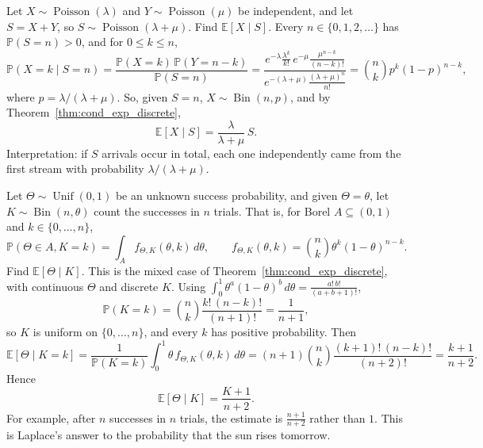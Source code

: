 	\begin{example}
		\label{ex:cond-exp-poisson}
		Let $X \sim \operatorname{Poisson}(\lambda)$ and $Y \sim \operatorname{Poisson}(\mu)$ be independent, and let $S = X + Y$, so $S \sim \operatorname{Poisson}(\lambda + \mu)$. Find $\mathbb{E}[X \mid S]$. Every $n \in \{0, 1, 2, \dots\}$ has $\mathbb{P}(S = n) > 0$, and for $0 \le k \le n$,
		\begin{equation}
			\mathbb{P}(X = k \mid S = n) = \frac{\mathbb{P}(X = k)\,\mathbb{P}(Y = n - k)}{\mathbb{P}(S = n)} = \frac{e^{-\lambda} \frac{\lambda^k}{k!}\, e^{-\mu} \frac{\mu^{n-k}}{(n-k)!}} {e^{-(\lambda + \mu)} \frac{(\lambda + \mu)^n}{n!}} = \binom{n}{k} p^k (1 - p)^{n - k},
		\end{equation}
		where $p = \lambda / (\lambda + \mu)$. So, given $S = n$, $X \sim \operatorname{Bin}(n, p)$, and by Theorem~\ref{thm:cond_exp_discrete},
		\begin{equation}
			\mathbb{E}[X \mid S] = \frac{\lambda}{\lambda + \mu}\, S.
		\end{equation}
		Interpretation: if $S$ arrivals occur in total, each one independently came from the first stream with probability $\lambda / (\lambda + \mu)$.
	\end{example}

	\begin{example}
		\label{ex:cond-exp-rule-of-succession}
		Let $\Theta \sim \operatorname{Unif}(0, 1)$ be an unknown success probability, and given $\Theta = \theta$, let $K \sim \operatorname{Bin}(n, \theta)$ count the successes in $n$ trials. That is, for Borel $A \subseteq (0, 1)$ and $k \in \{0, \dots, n\}$,
		\begin{equation}
			\mathbb{P}(\Theta \in A, K = k) = \int_A f_{\Theta, K}(\theta, k)\,d\theta, \qquad f_{\Theta, K}(\theta, k) = \binom{n}{k} \theta^k (1 - \theta)^{n - k}.
		\end{equation}
		Find $\mathbb{E}[\Theta \mid K]$. This is the mixed case of Theorem~\ref{thm:cond_exp_discrete}, with continuous $\Theta$ and discrete $K$. Using $\int_0^1 \theta^a (1 - \theta)^b \,d\theta = \frac{a!\, b!}{(a + b + 1)!}$,
		\begin{equation}
			\mathbb{P}(K = k) = \binom{n}{k} \frac{k!\,(n - k)!}{(n + 1)!} = \frac{1}{n + 1},
		\end{equation}
		so $K$ is uniform on $\{0, \dots, n\}$, and every $k$ has positive probability. Then
		\begin{equation}
			\mathbb{E}[\Theta \mid K = k] = \frac{1}{\mathbb{P}(K = k)} \int_0^1 \theta\, f_{\Theta, K}(\theta, k)\,d\theta = (n + 1) \binom{n}{k} \frac{(k + 1)!\,(n - k)!}{(n + 2)!} = \frac{k + 1}{n + 2}.
		\end{equation}
		Hence
		\begin{equation}
			\mathbb{E}[\Theta \mid K] = \frac{K + 1}{n + 2}.
		\end{equation}
		For example, after $n$ successes in $n$ trials, the estimate is $\frac{n + 1}{n + 2}$ rather than $1$. This is Laplace's answer to the probability that the sun rises tomorrow.
	\end{example}

